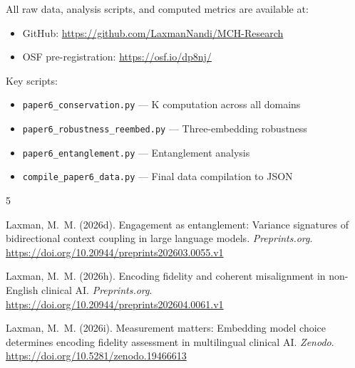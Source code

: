 \documentclass[11pt,a4paper]{article}
\begin{document}
All raw data, analysis scripts, and computed metrics are available at:
\begin{itemize}
    \item GitHub: \url{https://github.com/LaxmanNandi/MCH-Research}
    \item OSF pre-registration: \url{https://osf.io/dp8nj/}
\end{itemize}

Key scripts:
\begin{itemize}
    \item \texttt{paper6\_conservation.py} --- K computation across all domains
    \item \texttt{paper6\_robustness\_reembed.py} --- Three-embedding robustness
    \item \texttt{paper6\_entanglement.py} --- Entanglement analysis
    \item \texttt{compile\_paper6\_data.py} --- Final data compilation to JSON
\end{itemize}


\begin{thebibliography}{5}

Laxman, M.~M. (2026d).
\newblock Engagement as entanglement: Variance signatures of bidirectional
context coupling in large language models.
\newblock \emph{Preprints.org}.
\newblock \url{https://doi.org/10.20944/preprints202603.0055.v1}

Laxman, M.~M. (2026h).
\newblock Encoding fidelity and coherent misalignment in non-{E}nglish clinical {AI}.
\newblock \emph{Preprints.org}.
\newblock \url{https://doi.org/10.20944/preprints202604.0061.v1}

Laxman, M.~M. (2026i).
\newblock Measurement matters: Embedding model choice determines encoding
fidelity assessment in multilingual clinical {AI}.
\newblock \emph{Zenodo}.
\newblock \url{https://doi.org/10.5281/zenodo.19466613}

\end{thebibliography}
\end{document}
